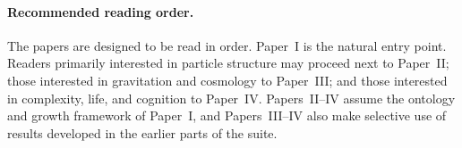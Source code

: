 \documentclass[11pt]{article}
\begin{document}
\paragraph{Recommended reading order.}
The papers are designed to be read in order. Paper~I is the natural entry point. Readers primarily interested in particle structure may proceed next to Paper~II; those interested in gravitation and cosmology to Paper~III; and those interested in complexity, life, and cognition to Paper~IV. Papers~II--IV assume the ontology and growth framework of Paper~I, and Papers~III--IV also make selective use of results developed in the earlier parts of the suite.
\end{document}
